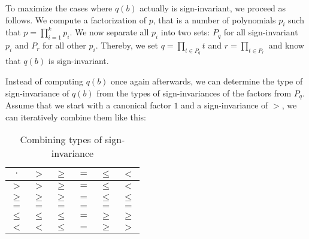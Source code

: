 To maximize the cases where $q(b)$ actually is sign-invariant, we proceed as follows.
We compute a factorization of $p$, that is a number of polynomials $p_i$ such that $p = \prod_{i=1}^k p_i$.
We now separate all $p_i$ into two sets: $P_q$ for all sign-invariant $p_i$ and $P_r$ for all other $p_i$.
Thereby, we set $q = \prod_{t \in P_q} t$ and $r = \prod_{t \in P_r}$ and know that $q(b)$ is sign-invariant.

Instead of computing $q(b)$ once again afterwards, we can determine the type of sign-invariance of $q(b)$ from the types of sign-invariances of the factors from $P_q$.
Assume that we start with a canonical factor $1$ and a sign-invariance of $>$, we can iteratively combine them like this:

\begin{table}
\begin{center}
\caption{Combining types of sign-invariance}
\begin{tabular}{|c||c|c|c|c|c|}
\hline
$\cdot$ & $>$ & $\geq$ & $=$ & $\leq$ & $<$ \\
\hline\hline
$>$ & $>$ & $\geq$ & $=$ & $\leq$ & $<$ \\
\hline
$\geq$ & $\geq$ & $\geq$ & $=$ & $\leq$ & $\leq$ \\
\hline
$=$ & $=$ & $=$ & $=$ & $=$ & $=$ \\
\hline
$\leq$ & $\leq$ & $\leq$ & $=$ & $\geq$ & $\geq$ \\
\hline
$<$ & $<$ & $\leq$ & $=$ & $\geq$ & $>$ \\
\hline
\end{tabular}
\end{center}
\end{table}
